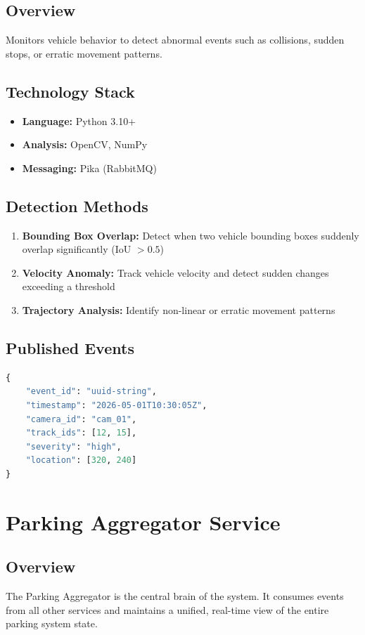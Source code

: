 \documentclass[12pt,a4paper]{report}
\begin{document}
\subsection{Overview}
Monitors vehicle behavior to detect abnormal events such as collisions, sudden stops, or erratic movement patterns.

\subsection{Technology Stack}
\begin{itemize}
    \item \textbf{Language:} Python 3.10+
    \item \textbf{Analysis:} OpenCV, NumPy
    \item \textbf{Messaging:} Pika (RabbitMQ)
\end{itemize}

\subsection{Detection Methods}
\begin{enumerate}
    \item \textbf{Bounding Box Overlap:} Detect when two vehicle bounding boxes suddenly overlap significantly (IoU $> 0.5$)
    \item \textbf{Velocity Anomaly:} Track vehicle velocity and detect sudden changes exceeding a threshold
    \item \textbf{Trajectory Analysis:} Identify non-linear or erratic movement patterns
\end{enumerate}

\subsection{Published Events}
\begin{lstlisting}[language=Python, caption=crash.detected.v1 Event Schema]
{
    "event_id": "uuid-string",
    "timestamp": "2026-05-01T10:30:05Z",
    "camera_id": "cam_01",
    "track_ids": [12, 15],
    "severity": "high",
    "location": [320, 240]
}
\end{lstlisting}


\section{Parking Aggregator Service}

\subsection{Overview}
The Parking Aggregator is the central brain of the system. It consumes events from all other services and maintains a unified, real-time view of the entire parking system state.
\end{document}
